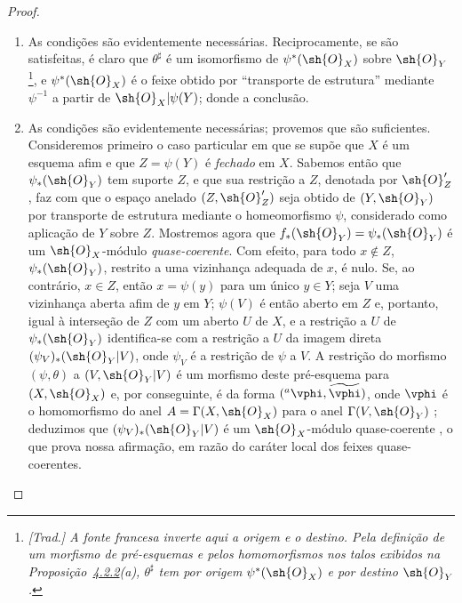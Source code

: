 \documentclass[oneside]{amsart}
\newcommand{\oldpage}[2][]{{\marginnote{\normalfont\textbf{#1}~|~#2}}\ignorespaces}
\begin{document}
\begin{proof}
\medskip\noindent
\begin{enumerate}
  \item[(a)] As condições são evidentemente necessárias.
    Reciprocamente, se são satisfeitas, é claro que $\theta^\sharp$ é um isomorfismo de $\psi^*(\sh{O}_X)$ sobre $\sh{O}_Y$\footnote{\emph{[Trad.] A fonte francesa inverte aqui a origem e o destino. Pela definição de um morfismo de pré-esquemas e pelos homomorfismos nos talos exibidos na Proposição~\hyperref[I.4.2.2]{4.2.2}(a), $\theta^\sharp$ tem por origem $\psi^*(\sh{O}_X)$ e por destino $\sh{O}_Y$.}}, e $\psi^*(\sh{O}_X)$ é o feixe obtido por ``transporte de estrutura'' mediante $\psi^{-1}$ a partir de $\sh{O}_X|\psi(Y)$;
    donde a conclusão.

  \item[(b)] As condições são evidentemente necessárias; provemos que são suficientes.
    Consideremos primeiro o caso particular em que se supõe que $X$ é um esquema afim e que $Z=\psi(Y)$ é \emph{fechado} em $X$.
    Sabemos então  que $\psi_*(\sh{O}_Y)$ tem suporte $Z$, e que sua restrição a $Z$, denotada por $\sh{O}_Z'$, faz com que o espaço anelado $(Z,\sh{O}_Z')$ seja obtido de $(Y,\sh{O}_Y)$ por transporte de estrutura mediante o homeomorfismo $\psi$, considerado como aplicação de $Y$ sobre $Z$.
    Mostremos agora que $f_*(\sh{O}_Y)=\psi_*(\sh{O}_Y)$ é um $\sh{O}_X$-módulo \emph{quase-coerente}.
    Com efeito, para todo $x\not\in Z$, $\psi_*(\sh{O}_Y)$, restrito a uma vizinhança adequada de $x$, é nulo.
    Se, ao contrário, $x\in Z$, então $x=\psi(y)$ para um único $y\in Y$;
    seja $V$ uma vizinhança aberta afim de $y$ em $Y$;
    $\psi(V)$ é então aberto em $Z$ e, portanto, igual à interseção de $Z$ com um aberto $U$ de $X$, e a restrição a $U$ de $\psi_*(\sh{O}_Y)$ identifica-se com a restrição a $U$ da imagem direta
\oldpage[I]{123}
    $(\psi_V)_*(\sh{O}_Y|V)$, onde $\psi_V$ é a restrição de $\psi$ a $V$.
    A restrição do morfismo $(\psi,\theta)$ a $(V,\sh{O}_Y|V)$ é um morfismo deste pré-esquema para $(X,\sh{O}_X)$ e, por conseguinte, é da forma $({}^a\vphi,\widetilde{\vphi})$, onde $\vphi$ é o homomorfismo do anel $A=\Gamma(X,\sh{O}_X)$ para o anel $\Gamma(V,\sh{O}_Y)$ ;
    deduzimos que $(\psi_V)_*(\sh{O}_Y|V)$ é um $\sh{O}_X$-módulo quase-coerente , o que prova nossa afirmação, em razão do caráter local dos feixes quase-coerentes.


\end{enumerate}
\end{proof}
\end{document}
